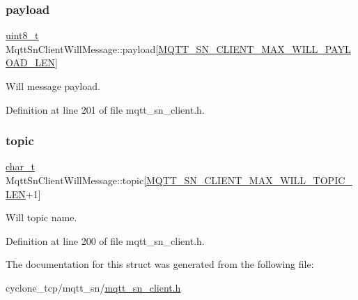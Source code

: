 \subsubsection{\texorpdfstring{payload}{payload}}
{\footnotesize\ttfamily \hyperlink{stdint_8h_aba7bc1797add20fe3efdf37ced1182c5}{uint8\+\_\+t} Mqtt\+Sn\+Client\+Will\+Message\+::payload\mbox{[}\hyperlink{mqtt__sn__client_8h_a1059cb0e47f7c47d79ca58c5f29c6126}{M\+Q\+T\+T\+\_\+\+S\+N\+\_\+\+C\+L\+I\+E\+N\+T\+\_\+\+M\+A\+X\+\_\+\+W\+I\+L\+L\+\_\+\+P\+A\+Y\+L\+O\+A\+D\+\_\+\+L\+EN}\mbox{]}}



Will message payload. 



Definition at line 201 of file mqtt\+\_\+sn\+\_\+client.\+h.

\mbox{\label{structMqttSnClientWillMessage_a5dcdbc663ae144fe3779645c679fe099}} 
\subsubsection{\texorpdfstring{topic}{topic}}
{\footnotesize\ttfamily \hyperlink{compiler__port_8h_a40bb5262bf908c328fbcfbe5d29d0201}{char\+\_\+t} Mqtt\+Sn\+Client\+Will\+Message\+::topic\mbox{[}\hyperlink{mqtt__sn__client_8h_ae418ee87e6d47c1cfdb4e7a5694a2caa}{M\+Q\+T\+T\+\_\+\+S\+N\+\_\+\+C\+L\+I\+E\+N\+T\+\_\+\+M\+A\+X\+\_\+\+W\+I\+L\+L\+\_\+\+T\+O\+P\+I\+C\+\_\+\+L\+EN}+1\mbox{]}}



Will topic name. 



Definition at line 200 of file mqtt\+\_\+sn\+\_\+client.\+h.



The documentation for this struct was generated from the following file\+:\begin{DoxyCompactItemize}
\item 
cyclone\+\_\+tcp/mqtt\+\_\+sn/\hyperlink{mqtt__sn__client_8h}{mqtt\+\_\+sn\+\_\+client.\+h}\end{DoxyCompactItemize}
